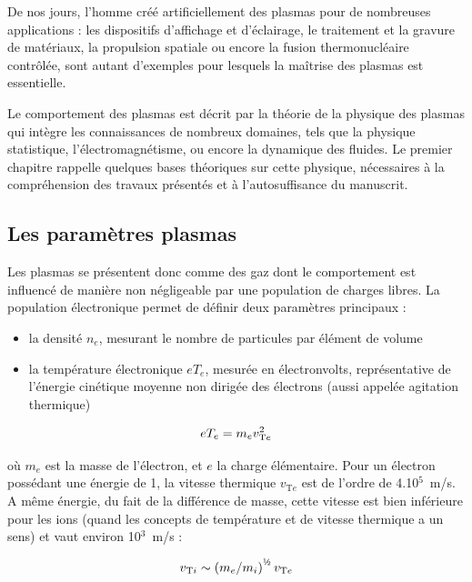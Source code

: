 \begin{refsection}
De nos jours, l'homme créé artificiellement des plasmas pour de nombreuses
applications : les dispositifs d'affichage et d'éclairage, le traitement et la
gravure de matériaux, la propulsion spatiale ou encore la fusion
thermonucléaire contrôlée, sont autant d'exemples pour lesquels la maîtrise des
plasmas est essentielle.

Le comportement des plasmas est décrit par la théorie de la physique des
plasmas qui intègre les connaissances de nombreux domaines, tels que la
physique statistique, l'électromagnétisme, ou encore la dynamique des fluides.
Le premier chapitre rappelle quelques bases théoriques sur cette physique,
nécessaires à la compréhension des travaux présentés et à l'autosuffisance du manuscrit.

\subsection{Les paramètres plasmas}
Les plasmas se présentent donc comme des gaz dont le comportement est influencé
de manière non négligeable par une population de charges libres.
La population électronique permet de définir deux paramètres principaux :

\begin{itemize}
  \item la densité $n_e$, mesurant le nombre
  de particules par élément de volume
  \item la température électronique $eT_e$, mesurée en électronvolts,
  représentative de l'énergie cinétique moyenne non dirigée des électrons (aussi appelée
   agitation thermique)
\end{itemize}

\begin{equation}
\label{1-VThermique}
	eT_{e}=m_{e} v_{\text{T}{e}}^{{2}}
\end{equation}

où $m_{e}$ est la masse de l'électron, et $e$ la charge élémentaire. Pour un électron possédant une énergie de
\unit{1}{\electronvolt}, la vitesse thermique $v_{\text{T}{e}}$ est de l'ordre
de 4.10$^5$~m/s. A même énergie, du fait de la différence de masse, cette vitesse est bien
inférieure pour les ions (quand les concepts de température et de
vitesse thermique a un sens) et vaut environ 10$^3 $~m/s :

\begin{equation}
	v_{\text{T}{i}}\sim\left(m_{e}/m_{i}\right)^{\text{\textonehalf}}
	v_{\text{T}{e}}
\end{equation}


\end{refsection}
